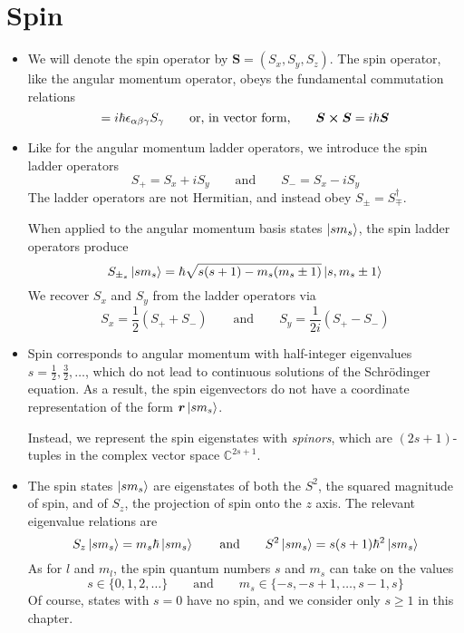 \documentclass[11pt, a4paper]{article}
\newcommand{\eqtext}[1]{\qquad \text{#1} \qquad}
\newcommand{\Schro}{Schr\"{o}dinger\xspace}
\newcommand{\Herm}{Hermitian\xspace}
\renewcommand{\vec}[1]{\bm{#1}}  %
\renewcommand{\r}{\vec{r}}  %
\renewcommand{\S}{\vec{S}}  %
\begin{document}
\newpage
\section{Spin}
\begin{itemize}
	\item We will denote the spin operator by $ \S = (S_{x}, S_{y}, S_{z}) $. The spin operator, like the angular momentum operator, obeys the fundamental commutation relations
	\begin{equation*}
		[S_{\alpha}, S_{\beta}] = i \hbar \epsilon_{\alpha \beta \gamma}S_{\gamma} \eqtext{or, in vector form,} \S \cross \S = i \hbar \S
	\end{equation*}
	
	\item Like for the angular momentum ladder operators, we introduce the spin ladder operators
	\begin{equation*}
		S_{+} = S_{x} + iS_{y} \eqtext{and} S_{-} = S_{x} - i S_{y}
	\end{equation*}
	The ladder operators are not \Herm, and instead obey $ S_{\pm} = S_{\mp}^{\dagger} $. 
	
	When applied to the angular momentum basis states $ \ket{sm_{s}} $, the spin ladder operators produce
	\begin{equation*}
		S_{\pm_{s}} \ket{sm_{s}} = \hbar \sqrt{s(s+1) - m_{s}(m_{s} \pm 1)}\ket{s, m_{s} \pm 1}
	\end{equation*}
	We recover $ S_{x} $ and $ S_{y} $ from the ladder operators via
	\begin{equation*}
		S_{x} = \frac{1}{2}(S_{+} + S_{-}) \eqtext{and} S_{y} = \frac{1}{2i}(S_{+} - S_{-}) 
	\end{equation*}
	
	\item Spin corresponds to angular momentum with half-integer eigenvalues $ s = \frac{1}{2}, \frac{3}{2}, \ldots $, which do not lead to continuous solutions of the \Schro equation. As a result, the spin eigenvectors do not have a coordinate representation of the form $ \r \ket{sm_{s}} $. 
	
	Instead, we represent the spin eigenstates with \textit{spinors}, which are $ (2s+1) $-tuples in the complex vector space $ \mathbb{C}^{2s + 1} $. 
	
	\item The spin states $ \ket{sm_{s}} $ are eigenstates of both the $ S^{2} $, the squared magnitude of spin, and of $ S_{z} $, the projection of spin onto the $ z $ axis. The relevant eigenvalue relations are
	\begin{equation*}
		S_{z}\ket{sm_{s}} = m_{s}\hbar \ket{sm_{s}} \eqtext{and} S^{2}\ket{sm_{s}} = s(s+1) \hbar^{2} \ket{sm_{s}}
	\end{equation*}
	As for $ l $ and $ m_{l} $, the spin quantum numbers $ s $ and $ m_{s} $ can take on the values
	\begin{equation*}
		s \in \{0, 1, 2, \ldots\} \eqtext{and} m_{s} \in \{-s, -s+1, \ldots, s-1, s\}
	\end{equation*}
	Of course, states with $ s = 0 $ have no spin, and we consider only $ s \geq 1 $ in this chapter.
	
	
\end{itemize}
\end{document}
